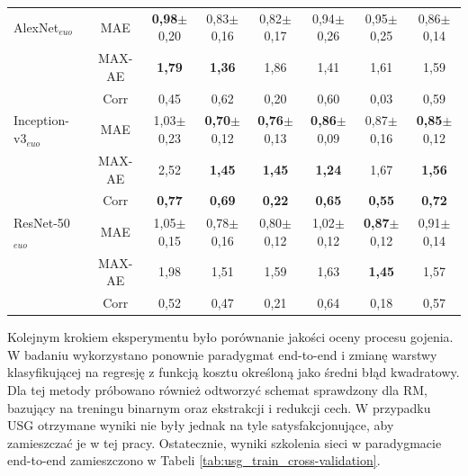 \begin{table}[h]
\begin{tabular}{lc||c|c|c|c|c|c}
		AlexNet$_{euo}$ & MAE & \textbf{0,98}$\pm$0,20 & 0,83$\pm$0,16 & 0,82$\pm$0,17 & 0,94$\pm$0,26 & 0,95$\pm$0,25 & 0,86$\pm$0,14  \\
		& MAX-AE & \textbf{1,79} & \textbf{1,36} & 1,86 & 1,41 & 1,61 & 1,59 \\ 
		& Corr & 0,45 & 0,62 & 0,20 & 0,60 & 0,03 & 0,59 \\ \hline
		Inception-v3$_{euo}$ & MAE & 1,03$\pm$0,23 & \textbf{0,70}$\pm$0,12 & \textbf{0,76}$\pm$0,13 & \textbf{0,86}$\pm$0,09 & 0,87$\pm$0,16 & \textbf{0,85}$\pm$0,12  \\
		& MAX-AE & 2,52 & \textbf{1,45} & \textbf{1,45} & \textbf{1,24} & 1,67 & \textbf{1,56} \\ 
		& Corr & \textbf{0,77} & \textbf{0,69} & \textbf{0,22} & \textbf{0,65} & \textbf{0,55} & \textbf{0,72} \\ \hline
		ResNet-50$_{euo}$ & MAE & 1,05$\pm$0,15 & 0,78$\pm$0,16 & 0,80$\pm$0,12 & 1,02$\pm$0,12 & \textbf{0,87}$\pm$0,12 & 0,91$\pm$0,14 \\
		& MAX-AE & 1,98 & 1,51 & 1,59 & 1,63 & \textbf{1,45} & 1,57 \\
		& Corr & 0,52 & 0,47 & 0,21 & 0,64 & 0,18 & 0,57 \\ 
		
	\end{tabular}
\end{table}
\renewcommand{\arraystretch}{1}

Kolejnym krokiem eksperymentu było porównanie jakości oceny procesu gojenia. W badaniu wykorzystano ponownie paradygmat end-to-end i zmianę warstwy klasyfikującej na regresję z funkcją kosztu określoną jako średni błąd kwadratowy. Dla tej metody próbowano również odtworzyć schemat sprawdzony dla RM, bazujący na treningu binarnym oraz ekstrakcji i redukcji cech. W przypadku USG otrzymane wyniki nie były jednak na tyle satysfakcjonujące, aby zamieszczać je w tej pracy. Ostatecznie, wyniki szkolenia sieci w paradygmacie end-to-end zamieszczono w Tabeli \ref{tab:usg_train_cross-validation}.

